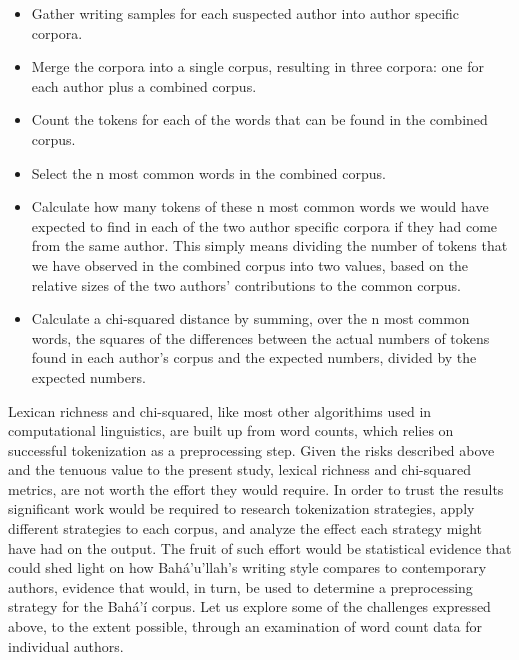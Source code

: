 \documentclass[12pt, oneside]{report}
\begin{document}
\begin{itemize}
\item Gather writing samples for each suspected author into author specific corpora.
\item Merge the corpora into a single corpus, resulting in three corpora: one for each author plus a combined corpus.
\item Count the tokens for each of the words that can be found in the combined corpus.
\item Select the n most common words in the combined corpus.
\item Calculate how many tokens of these n most common words we would have expected to find in each of the two author specific corpora if they had come from the same author. This simply means dividing the number of tokens that we have observed in the combined corpus into two values, based on the relative sizes of the two authors’ contributions to the common corpus.
\item Calculate a chi-squared distance by summing, over the n most common words, the squares of the differences between the actual numbers of tokens found in each author’s corpus and the expected numbers, divided by the expected numbers.
\end{itemize}
\par
Lexican richness and chi-squared, like most other algorithims used in computational linguistics, are built up from word counts, which relies on successful tokenization as a preprocessing step. Given the risks described above and the tenuous value to the present study, lexical richness and chi-squared metrics, are not worth the effort they would require. In order to trust the results significant work would be required to research tokenization strategies, apply different strategies to each corpus, and analyze the effect each strategy might have had on the output. The fruit of such effort would be statistical evidence that could shed light on how Bah\'{a}'u'llah's writing style compares to contemporary authors, evidence that would, in turn, be used to determine a preprocessing strategy for the Bah\'{a}'\'{i} corpus. Let us explore some of the challenges expressed above, to the extent possible, through an examination of word count data for individual authors.
\end{document}
